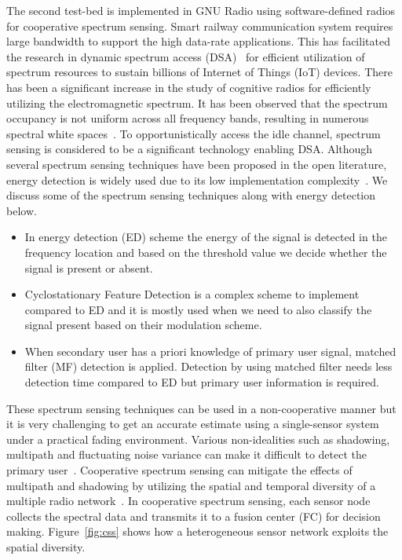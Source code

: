 The second test-bed is implemented in GNU Radio using software-defined radios for cooperative spectrum sensing. Smart railway communication system requires large bandwidth to support the high data-rate applications. This has facilitated the research in dynamic spectrum access (DSA)~\cite{arhtn2,arhtn3} for efficient utilization of spectrum resources to sustain billions of Internet of Things (IoT) devices. There has been a significant increase in the study of cognitive radios for efficiently utilizing the electromagnetic spectrum. It has been observed that the spectrum occupancy is not uniform across all frequency bands, resulting in numerous spectral white spaces~\cite{bookhtn1}. To opportunistically access the idle channel, spectrum sensing is considered to be a significant technology enabling DSA. Although several spectrum sensing techniques have been proposed in the open literature, energy detection is widely used due to its low implementation complexity~\cite{arhtn4}. We discuss some of the spectrum sensing techniques along with energy detection below.
\begin{itemize}
\item In energy detection (ED) scheme the energy of the signal is detected in the frequency location and based on the threshold value we decide whether the signal is present or absent.

\item Cyclostationary Feature Detection is a complex scheme to implement compared to ED and it is mostly used when we need to also classify the signal present based on their modulation scheme.

\item When secondary user has a priori knowledge of primary user signal, matched  filter (MF)  detection  is  applied. Detection by using matched filter needs less detection time compared to ED but primary user information is required.
\end{itemize}

These spectrum sensing techniques can be used in a non-cooperative manner but it is very challenging to get an accurate estimate using a single-sensor system under a practical fading environment. Various non-idealities such as shadowing, multipath and fluctuating noise variance can make it difficult to detect the primary user~\cite{inphtn5,inphtn6}. Cooperative spectrum sensing can mitigate the effects of multipath and shadowing by utilizing the spatial and temporal diversity of a multiple radio network~\cite{inphtn7,inphtn8}. In cooperative spectrum sensing, each sensor node collects the spectral data and transmits it to a fusion center (FC) for decision making. Figure~\ref{fig:css} shows how a heterogeneous sensor network exploits the spatial diversity. 

